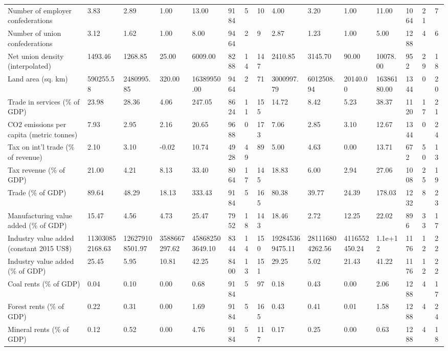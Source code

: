 \begin{longtable}{lllllllllllllll}
Number of employer confederations & 3.83 & 2.89 & 1.00 & 13.00 & 9184 & 5 & 10 & 4.00 & 3.20 & 1.00 & 11.00 & 1064 & 21 & 7\\
Number of union confederations & 3.12 & 1.62 & 1.00 & 8.00 & 9464 & 2 & 9 & 2.87 & 1.23 & 1.00 & 5.00 & 1288 & 4 & 6\\
Net union density (interpolated) & 1493.46 & 1268.85 & 25.00 & 6009.00 & 8288 & 14 & 147 & 2410.85 & 3145.70 & 90.00 & 10078.00 & 952 & 29 & 18\\
Land area (sq. km) & 590255.58 & 2480995.85 & 320.00 & 16389950.00 & 9464 & 2 & 71 & 3000997.79 & 6012508.94 & 20140.00 & 16386180.00 & 1344 & 0 & 20\\
\addlinespace
Trade in services (\% of GDP) & 23.98 & 28.36 & 4.06 & 247.05 & 8624 & 11 & 155 & 14.72 & 8.42 & 5.23 & 38.37 & 1120 & 17 & 21\\
CO2 emissions per capita (metric tonnes) & 7.93 & 2.95 & 2.16 & 20.65 & 9688 & 0 & 173 & 7.06 & 2.85 & 3.10 & 12.67 & 1344 & 0 & 24\\
Tax on int'l trade (\% of revenue) & 2.10 & 3.10 & -0.02 & 10.74 & 4928 & 49 & 89 & 5.00 & 4.63 & 0.00 & 13.71 & 672 & 50 & 13\\
Tax revenue (\% of GDP) & 21.00 & 4.21 & 8.13 & 33.40 & 8064 & 17 & 145 & 18.83 & 6.00 & 2.94 & 27.06 & 1008 & 25 & 19\\
Trade (\% of GDP) & 89.64 & 48.29 & 18.13 & 333.43 & 9184 & 5 & 165 & 80.38 & 39.77 & 24.39 & 178.03 & 1232 & 8 & 23\\
\addlinespace
Manufacturing value added (\% of GDP) & 15.47 & 4.56 & 4.73 & 25.47 & 7952 & 18 & 143 & 18.46 & 2.72 & 12.25 & 22.02 & 896 & 33 & 17\\
Industry value added (constant 2015 US\$) & 113030852168.63 & 126279108501.97 & 3588667297.62 & 458682503649.10 & 8344 & 14 & 150 & 192845369475.11 & 281116804262.56 & 4116552450.24 & 1.1e+12 & 1176 & 12 & 22\\
Industry value added (\% of GDP) & 25.45 & 5.95 & 10.81 & 42.25 & 8400 & 13 & 151 & 29.25 & 5.02 & 21.43 & 41.22 & 1176 & 12 & 22\\
Coal rents (\% of GDP) & 0.04 & 0.10 & 0.00 & 0.68 & 9184 & 5 & 97 & 0.18 & 0.43 & 0.00 & 2.06 & 1288 & 4 & 17\\
Forest rents (\% of GDP) & 0.22 & 0.31 & 0.00 & 1.69 & 9184 & 5 & 165 & 0.43 & 0.41 & 0.01 & 1.58 & 1288 & 4 & 24\\
\addlinespace
Mineral rents (\% of GDP) & 0.12 & 0.52 & 0.00 & 4.76 & 9184 & 5 & 117 & 0.17 & 0.25 & 0.00 & 0.63 & 1288 & 4 & 18\\

\end{longtable}
